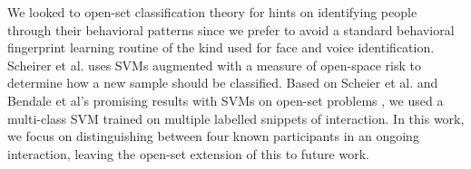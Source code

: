\documentclass[conference]{IEEEtran}
\begin{document}
We looked to open-set classification theory for hints on identifying people through their behavioral patterns since we prefer to avoid a standard behavioral fingerprint learning routine of the kind used for face and voice identification. Scheirer et al. uses SVMs augmented with a measure of open-space risk to determine how a new sample should be classified\cite{scheirer_toward_2013}. Based on Scheier et al. and Bendale et al's promising results with SVMs on open-set problems \cite{bendale_towards_2015}\cite{scheirer_toward_2013}, we used a multi-class SVM trained on multiple labelled snippets of interaction. In this work, we focus on distinguishing between four known participants in an ongoing interaction, leaving the open-set extension of this to future work.

\end{document}
